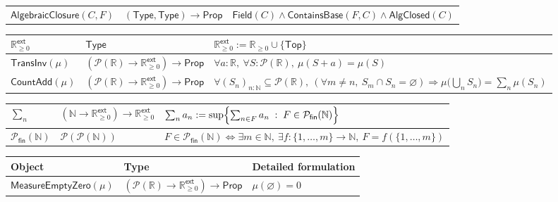 \documentclass[11pt,reqno]{amsart}
\theoremstyle{blueplain}
\numberwithin{equation}{section}
\begin{document}
{\begin{tabular}{|m{4cm}|m{5cm}|m{9cm}|}
		$\mathsf{AlgebraicClosure}(C,F)$ & $(\mathsf{Type},\mathsf{Type})\to\mathsf{Prop}$ &
		$\mathsf{Field}(C)\wedge\mathsf{ContainsBase}(F,C)\wedge\mathsf{AlgClosed}(C)$ \\ 
	\end{tabular}%
	\noindent \newline
	\noindent
	\begin{tabular}{|m{4cm}|m{5cm}|m{9cm}|}
		\hline
		$\mathbb{R}_{\ge 0}^{\mathsf{ext}}$ & $\mathsf{Type}$ &
		$\mathbb{R}_{\ge 0}^{\mathsf{ext}} := \mathbb{R}_{\ge 0}\cup\{\mathsf{Top}\}$ \\ \hline
		$\mathsf{TransInv}(\mu)$ & $(\mathcal{P}(\mathbb{R})\to\mathbb{R}_{\ge 0}^{\mathsf{ext}})\to\mathsf{Prop}$ &
		$\forall a:\mathbb{R},\ \forall S:\mathcal{P}(\mathbb{R}),\ \mu(S+a)=\mu(S)$ \\ \hline
		$\mathsf{CountAdd}(\mu)$ & $(\mathcal{P}(\mathbb{R})\to\mathbb{R}_{\ge 0}^{\mathsf{ext}})\to\mathsf{Prop}$ &
		$\forall(S_n)_{n:\mathbb{N}}\subseteq\mathcal{P}(\mathbb{R}),\
		(\forall m\neq n,\ S_m\cap S_n=\varnothing)\Rightarrow
		\mu\bigl(\bigcup_n S_n\bigr)=\sum_n\mu(S_n)$ \\
	\end{tabular}%
	\noindent \newline
	\noindent
	\begin{tabular}{|m{4cm}|m{5cm}|m{9cm}|}
		\hline
		$\sum_n$ & $(\mathbb{N}\to\mathbb{R}_{\ge 0}^{\mathsf{ext}})\to\mathbb{R}_{\ge 0}^{\mathsf{ext}}$ &
		$\sum_n a_n := \sup\Bigl\{\sum_{n\in F}a_n \;:\; F\in\mathcal{P}_{\mathsf{fin}}(\mathbb{N})\Bigr\}$ \\ \hline
		$\mathcal{P}_{\mathsf{fin}}(\mathbb{N})$ & $\mathcal{P}(\mathcal{P}(\mathbb{N}))$ &
		$F\in\mathcal{P}_{\mathsf{fin}}(\mathbb{N}) \iff \exists m\in\mathbb{N},\ \exists f:\{1,\dots,m\}\to\mathbb{N},\ F=f(\{1,\dots,m\})$ \\
	\end{tabular}%
	\noindent \newline
	\noindent
	\noindent \newline
	\noindent
	\begin{tabular}{|m{4cm}|m{5cm}|m{9cm}|}
		\hline
		\textbf{Object} & \textbf{Type} & \textbf{Detailed formulation} \\ \hline
		$\mathsf{MeasureEmptyZero}(\mu)$ & $(\mathcal{P}(\mathbb{R})\to\mathbb{R}_{\ge 0}^{\mathsf{ext}})\to\mathsf{Prop}$ &
		$\mu(\varnothing)=0$ \\
	\end{tabular}%
}
\end{document}

